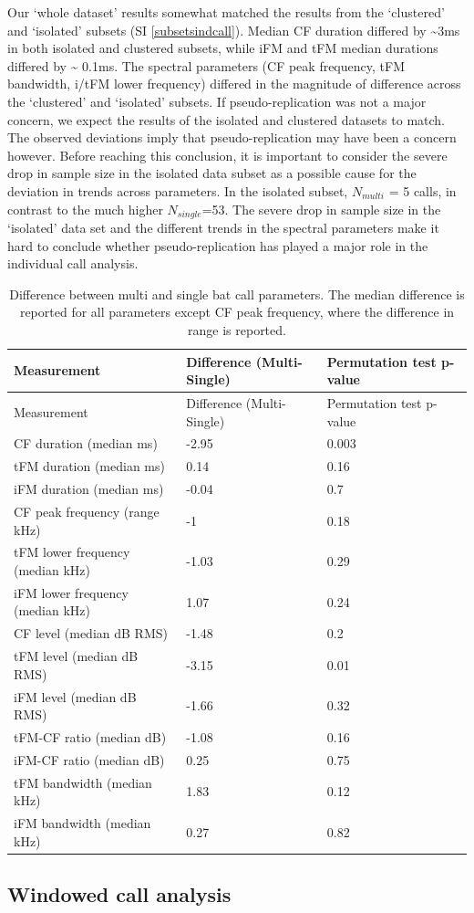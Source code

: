 \documentclass[
]{book}
\begin{document}
Our `whole dataset' results somewhat matched the results from the `clustered' and `isolated' subsets (SI \ref{subsetsindcall}). Median CF duration differed by \textasciitilde3ms in both isolated and clustered subsets, while iFM and tFM median durations differed by \textasciitilde{} 0.1ms. The spectral parameters (CF peak frequency, tFM bandwidth, i/tFM lower frequency) differed in the magnitude of difference across the `clustered' and `isolated' subsets. If pseudo-replication was not a major concern, we expect the results of the isolated and clustered datasets to match. The observed deviations imply that pseudo-replication may have been a concern however. Before reaching this conclusion, it is important to consider the severe drop in sample size in the isolated data subset as a possible cause for the deviation in trends across parameters. In the isolated subset, \(N_{multi}\) = 5 calls, in contrast to the much higher \(N_{single}\)=53. The severe drop in sample size in the `isolated' data set and the different trends in the spectral parameters make it hard to conclude whether pseudo-replication has played a major role in the individual call analysis.

\begin{longtable}[]{@{}lll@{}}
\caption{\label{tab:alldataindcall} Difference between multi and single bat call parameters. The median difference is reported for all parameters except CF peak frequency, where the difference in range is reported.}\tabularnewline
\toprule
Measurement & Difference (Multi-Single) & Permutation test p-value\tabularnewline
\midrule
\endfirsthead
\toprule
Measurement & Difference (Multi-Single) & Permutation test p-value\tabularnewline
\midrule
\endhead
CF duration (median ms) & -2.95 & 0.003\tabularnewline
tFM duration (median ms) & 0.14 & 0.16\tabularnewline
iFM duration (median ms) & -0.04 & 0.7\tabularnewline
CF peak frequency (range kHz) & -1 & 0.18\tabularnewline
tFM lower frequency (median kHz) & -1.03 & 0.29\tabularnewline
iFM lower frequency (median kHz) & 1.07 & 0.24\tabularnewline
CF level (median dB RMS) & -1.48 & 0.2\tabularnewline
tFM level (median dB RMS) & -3.15 & 0.01\tabularnewline
iFM level (median dB RMS) & -1.66 & 0.32\tabularnewline
tFM-CF ratio (median dB) & -1.08 & 0.16\tabularnewline
iFM-CF ratio (median dB) & 0.25 & 0.75\tabularnewline
tFM bandwidth (median kHz) & 1.83 & 0.12\tabularnewline
iFM bandwidth (median kHz) & 0.27 & 0.82\tabularnewline
\bottomrule
\end{longtable}

\hypertarget{windowed-call-analysis-1}{%
\subsection{Windowed call analysis}\label{windowed-call-analysis-1}}
\end{document}
